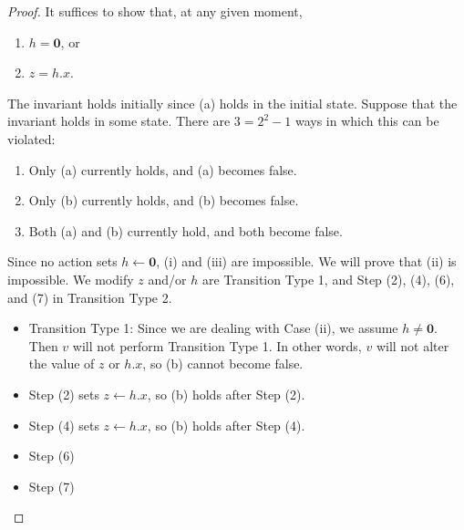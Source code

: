 \begin{proof}
    It suffices to show that, at any given moment,
    \begin{enumerate}[label=(\alph*)]
        \item %
            $h = \textbf{0}$, or
        \item %
            $z = h.x$.
    \end{enumerate}
    The invariant holds initially since (a) holds in the initial state.
    Suppose that the invariant holds in some state.
    There are $3 = 2^2 - 1$ ways in which this can be violated:
    \begin{enumerate}[label=(\roman*)]
        \item  %
            Only (a) currently holds, and (a) becomes false.
        \item  %
            Only (b) currently holds, and (b) becomes false.
        \item  %
            Both (a) and (b) currently hold, and both become false.
    \end{enumerate}
    Since no action sets $h \leftarrow \textbf{0}$, (i) and (iii) are impossible.
    We will prove that (ii) is impossible.
    We modify $z$ and/or $h$ are Transition Type 1, and Step (2), (4), (6), and (7) in Transition Type 2.
    \begin{itemize}
        \item
            Transition Type 1: Since we are dealing with Case (ii), we assume $h \ne \textbf{0}$.
            Then $v$ will not perform Transition Type 1.
            In other words, $v$ will not alter the value of $z$ or $h.x$, so (b) cannot become false.
        \item
            Step (2) sets $z \leftarrow h.x$, so (b) holds after Step (2).
        \item
            Step (4) sets $z \leftarrow h.x$, so (b) holds after Step (4).
        \item
            Step (6)
        \item
            Step (7)
    \end{itemize}
\end{proof}

